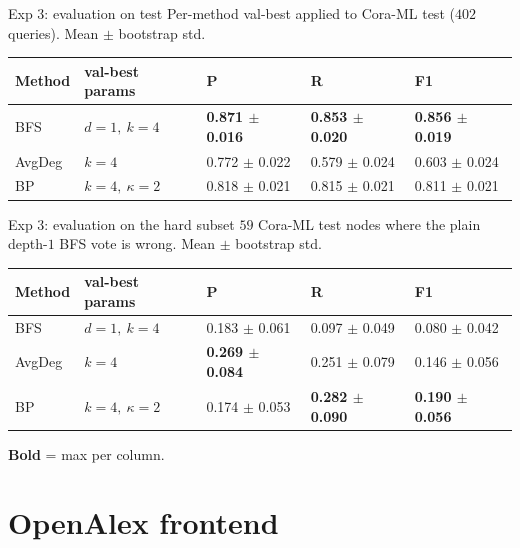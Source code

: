\documentclass{beamer}
\begin{document}
\begin{frame}{Exp 3: evaluation on test}
  Per-method val-best applied to Cora-ML test ($402$ queries). Mean $\pm$ bootstrap std.

  \vfill

  \scriptsize
  \begin{center}
  \begin{tabular}{lllll}
    \toprule
    Method & val-best params           & P     & R     & F1 \\
    \midrule
    BFS    & $d = 1,\ k = 4$           & \textbf{0.871 $\pm$ 0.016} & \textbf{0.853 $\pm$ 0.020} & \textbf{0.856 $\pm$ 0.019} \\
    AvgDeg & $k = 4$                   & 0.772 $\pm$ 0.022 & 0.579 $\pm$ 0.024 & 0.603 $\pm$ 0.024 \\
    BP     & $k = 4,\ \kappa = 2$      & 0.818 $\pm$ 0.021 & 0.815 $\pm$ 0.021 & 0.811 $\pm$ 0.021 \\
    \bottomrule
  \end{tabular}
  \end{center}

\end{frame}

\begin{frame}{Exp 3: evaluation on the hard subset}
  $59$ Cora-ML test nodes where the plain depth-$1$ BFS vote is wrong. Mean $\pm$ bootstrap std.

  \vfill

  \scriptsize
  \begin{center}
  \begin{tabular}{lllll}
    \toprule
    Method & val-best params           & P     & R     & F1 \\
    \midrule
    BFS    & $d = 1,\ k = 4$           & 0.183 $\pm$ 0.061 & 0.097 $\pm$ 0.049 & 0.080 $\pm$ 0.042 \\
    AvgDeg & $k = 4$                   & \textbf{0.269 $\pm$ 0.084} & 0.251 $\pm$ 0.079 & 0.146 $\pm$ 0.056 \\
    BP     & $k = 4,\ \kappa = 2$      & 0.174 $\pm$ 0.053 & \textbf{0.282 $\pm$ 0.090} & \textbf{0.190 $\pm$ 0.056} \\
    \bottomrule
  \end{tabular}
  \end{center}

  \vfill

  \scriptsize \textbf{Bold} = max per column.
\end{frame}

\section{OpenAlex frontend}
\end{document}

